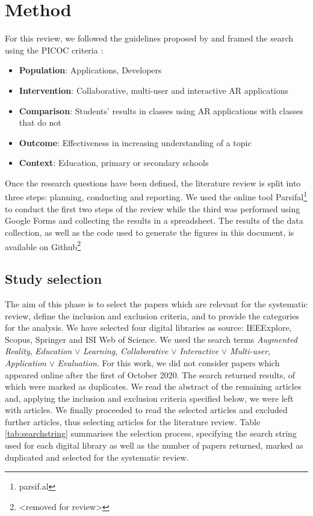 
\section{Method}\label{sec:methods}
For this review, we followed the guidelines proposed by \citet{kitchenham2009systematic} and framed the search using the PICOC criteria \citep{petticrew2008systematic}:
\begin{itemize}
    \item \textbf{Population}: Applications, Developers
    \item \textbf{Intervention}: Collaborative, multi-user and interactive \gls{AR} applications
    \item \textbf{Comparison}: Students' results in classes using AR applications with classes that do not
    \item \textbf{Outcome}: Effectiveness in increasing understanding of a topic
    \item \textbf{Context}: Education, primary or secondary schools
\end{itemize}

Once the research questions have been defined, the literature review is split into three steps: planning, conducting and reporting. We used the online tool Parsifal\footnote{parsif.al} to conduct the first two steps of the review while the third was performed using Google Forms and collecting the results in a spreadsheet. The results of the data collection, as well as the code used to generate the figures in this document, is available on Github\footnote{\textless removed for review\textgreater}

\subsection{Study selection}
The aim of this phase is to select the papers which are relevant for the systematic review, define the inclusion and exclusion criteria, and to provide the categories for the analysis.
We have selected four digital libraries as source: IEEExplore, Scopus, Springer and ISI Web of Science. We used the search terms \emph{Augmented Reality}, \emph{Education} $\lor$ \emph{Learning}, \emph{Collaborative} $\lor$ \emph{Interactive} $\lor$ \emph{Multi-user}, \emph{Application} $\lor$ \emph{Evaluation}. For this work, we did not consider papers which appeared online after the first of October 2020. The search returned \allPapers results, of which \duplPapers were marked as duplicates. We read the abstract of the remaining \papersCheckAbstract articles and, applying the inclusion and exclusion criteria specified below, we were left with \papersToRead articles. We finally proceeded to read the selected articles and excluded \papersExludedAfterReading further articles, thus selecting \papersSelected articles for the literature review.
Table \ref{tab:searchstring} summarises the selection process, specifying the search string used for each digital library as well as the number of papers returned, marked as duplicated and selected for the systematic review.

